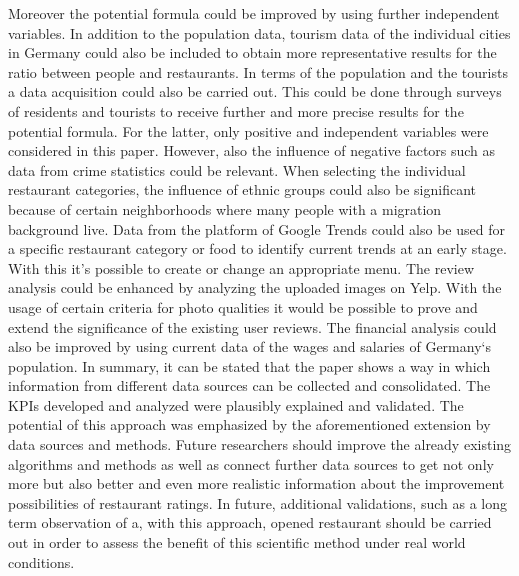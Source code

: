 Moreover the potential formula could be improved by using further independent variables. In addition to the population data, tourism data of the individual cities in Germany could also be included to obtain more representative results for the ratio between people and restaurants. In terms of the population and the tourists a data acquisition could also be carried out. This could be done through surveys of residents and tourists to receive further and more precise results for the potential formula. For the latter, only positive and independent variables were considered in this paper. However, also the influence of negative factors such as data from crime statistics could be relevant. \newline
When selecting the individual restaurant categories, the influence of ethnic groups could also be significant because of certain neighborhoods where many people with a migration background live. Data from the platform of Google Trends could also be used for a specific restaurant category or food to identify current trends at an early stage. With this it's possible to create or change an appropriate menu. \newline
The review analysis could be enhanced by analyzing the uploaded images on Yelp. With the usage of certain criteria for photo qualities it would be possible to prove and extend the significance of the existing user reviews. The financial analysis could also be improved by using current data of the wages and salaries of Germany‘s population.\newline
In summary, it can be stated that the paper shows a way in which information from different data sources can be collected and consolidated.
The \acp{KPI} developed and analyzed were plausibly explained and validated.
The potential of this approach was emphasized by the aforementioned extension by data sources and methods.
Future researchers should improve the already existing algorithms and methods as well as connect further data sources to get not only more but also better and even more realistic information about the improvement possibilities of restaurant ratings.
In future, additional validations, such as a long term observation of a, with this approach, opened restaurant should be carried out in order to assess the benefit of this scientific method under real world conditions.
